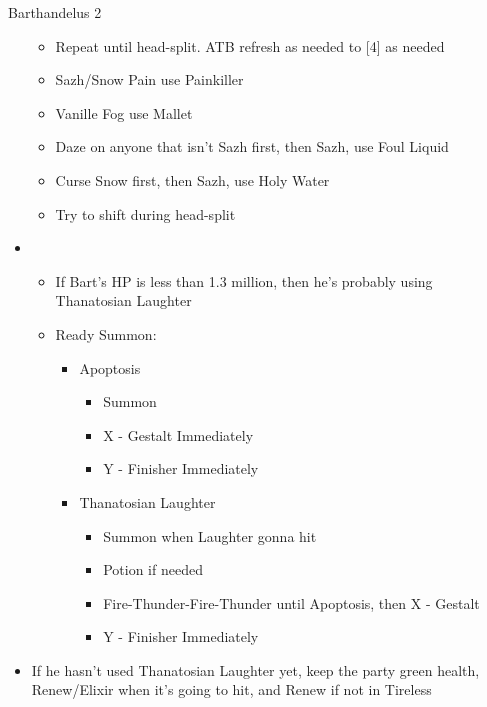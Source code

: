 \begin{battle}{Barthandelus 2}
\begin{multicols}{2}
\begin{itemize}
            \begin{itemize}
              \item Repeat until head-split. ATB refresh as needed to [4] as needed
              \item Sazh/Snow Pain use Painkiller
              \item Vanille Fog use Mallet
              \item Daze on anyone that isn't Sazh first, then Sazh, use Foul Liquid
              \item Curse Snow first, then Sazh, use Holy Water
              \item Try to shift during head-split
            \end{itemize}
      \item \fifth
            \begin{itemize}
              \item If Bart's HP is less than 1.3 million, then he's probably using Thanatosian Laughter
              \item Ready Summon:
                    \begin{itemize}
                      \item Apoptosis
                            \begin{itemize}
                              \item Summon
                              \item X - Gestalt Immediately
                              \item Y - Finisher Immediately
                            \end{itemize}
                      \item Thanatosian Laughter
                            \begin{itemize}
                              \item Summon when Laughter gonna hit
                              \item Potion if needed
                              \item Fire-Thunder-Fire-Thunder until Apoptosis, then X - Gestalt
                              \item Y - Finisher Immediately
                            \end{itemize}
                    \end{itemize}
            \end{itemize}
            \columnbreak
      \item If he hasn't used Thanatosian Laughter yet, keep the party green health, Renew/Elixir when it's going to hit, and Renew if not in Tireless

\end{itemize}
\end{multicols}
\end{battle}

